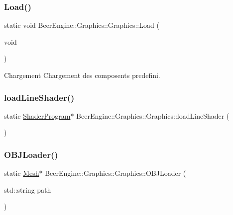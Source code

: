 \subsubsection{\texorpdfstring{Load()}{Load()}}
{\footnotesize\ttfamily static void Beer\+Engine\+::\+Graphics\+::\+Graphics\+::\+Load (\begin{DoxyParamCaption}\item[{void}]{ }\end{DoxyParamCaption})\hspace{0.3cm}{\ttfamily [static]}}



Chargement Chargement des composents predefini. 

\mbox{\label{class_beer_engine_1_1_graphics_1_1_graphics_a385cbcbf514ef7c22cb4a0ed6f577908}} 
\subsubsection{\texorpdfstring{load\+Line\+Shader()}{loadLineShader()}}
{\footnotesize\ttfamily static \mbox{\hyperlink{class_beer_engine_1_1_graphics_1_1_shader_program}{Shader\+Program}}$\ast$ Beer\+Engine\+::\+Graphics\+::\+Graphics\+::load\+Line\+Shader (\begin{DoxyParamCaption}{ }\end{DoxyParamCaption})\hspace{0.3cm}{\ttfamily [static]}}

\mbox{\label{class_beer_engine_1_1_graphics_1_1_graphics_a0b9081ae33ab8eb0a166c49f70d907ef}} 
\subsubsection{\texorpdfstring{O\+B\+J\+Loader()}{OBJLoader()}}
{\footnotesize\ttfamily static \mbox{\hyperlink{class_beer_engine_1_1_graphics_1_1_mesh}{Mesh}}$\ast$ Beer\+Engine\+::\+Graphics\+::\+Graphics\+::\+O\+B\+J\+Loader (\begin{DoxyParamCaption}\item[{std\+::string}]{path }\end{DoxyParamCaption})\hspace{0.3cm}{\ttfamily [static]}}



